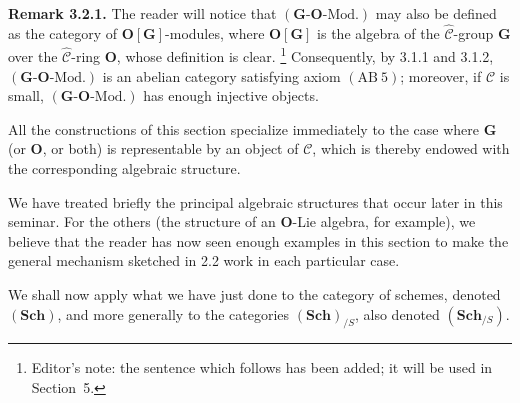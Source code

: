\medskip
\noindent\textbf{Remark 3.2.1.}
The reader will notice that \((\mathbf G\text{-}\mathbf O\text{-Mod.})\)
may also be defined as the category of \(\mathbf O[\mathbf G]\)-modules,
where \(\mathbf O[\mathbf G]\) is the algebra of the
\(\widehat{\mathscr C}\)-group \(\mathbf G\) over the
\(\widehat{\mathscr C}\)-ring \(\mathbf O\), whose definition is clear.
\footnote{Editor's note: the sentence which follows has been added; it will
be used in Section~5.}
Consequently, by 3.1.1 and 3.1.2,
\((\mathbf G\text{-}\mathbf O\text{-Mod.})\) is an abelian category
satisfying axiom \(\mathrm{(AB\ 5)}\); moreover, if \(\mathscr C\) is
small, \((\mathbf G\text{-}\mathbf O\text{-Mod.})\) has enough injective
objects.

All the constructions of this section specialize immediately to the case
where \(\mathbf G\) (or \(\mathbf O\), or both) is representable by an
object of \(\mathscr C\), which is thereby endowed with the corresponding
algebraic structure.

We have treated briefly the principal algebraic structures that occur later
in this seminar. For the others (the structure of an \(\mathbf O\)-Lie
algebra, for example), we believe that the reader has now seen enough
examples in this section to make the general mechanism sketched in 2.2 work
in each particular case.

We shall now apply what we have just done to the category of schemes, denoted
\((\mathbf{Sch})\), and more generally to the categories
\((\mathbf{Sch})_{/S}\), also denoted \((\mathbf{Sch}_{/S})\).

